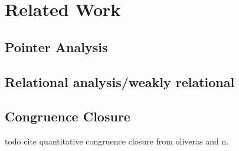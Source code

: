\chapter{Related Work}


\section{Pointer Analysis}

\section{Relational analysis/weakly relational}

\section{Congruence Closure}


todo cite quantitative congruence closure from oliveras and n.

